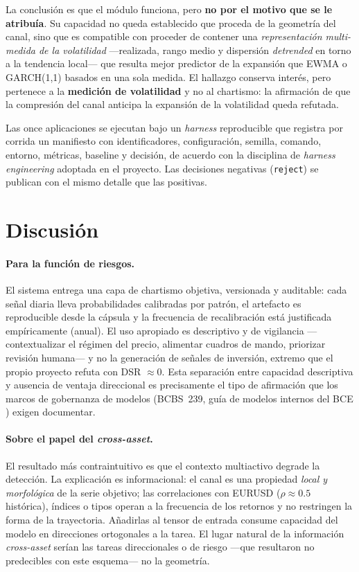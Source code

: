 \documentclass[11pt,a4paper]{article}
\begin{document}
La conclusión es que el módulo funciona, pero \textbf{no por el motivo que se le
atribuía}. Su capacidad no queda establecido que proceda de la geometría del canal, sino que es compatible con proceder de contener una
\emph{representación multi-medida de la volatilidad} —realizada, rango medio y
dispersión \emph{detrended} en torno a la tendencia local— que resulta mejor
predictor de la expansión que EWMA o GARCH(1,1) basados en una sola medida. El
hallazgo conserva interés, pero pertenece a la \textbf{medición de volatilidad} y
no al chartismo: la afirmación de que la compresión del canal anticipa la
expansión de la volatilidad queda refutada.

Las once aplicaciones se ejecutan bajo un \emph{harness} reproducible que registra
por corrida un manifiesto con identificadores, configuración, semilla, comando,
entorno, métricas, baseline y decisión, de acuerdo con la disciplina de
\emph{harness engineering} adoptada en el proyecto. Las decisiones negativas
(\texttt{reject}) se publican con el mismo detalle que las positivas.

\section{Discusión}
\paragraph{Para la función de riesgos.} El sistema entrega una capa de chartismo
objetiva, versionada y auditable: cada señal diaria lleva probabilidades
calibradas por patrón, el artefacto es reproducible desde la cápsula y la
frecuencia de recalibración está justificada empíricamente (anual). El uso
apropiado es descriptivo y de vigilancia —contextualizar el régimen del precio,
alimentar cuadros de mando, priorizar revisión humana— y no la generación de
señales de inversión, extremo que el propio proyecto refuta con DSR $\approx 0$.
Esta separación entre capacidad descriptiva y ausencia de ventaja direccional es
precisamente el tipo de afirmación que los marcos de gobernanza de modelos
(BCBS~239, guía de modelos internos del BCE \cite{bcbs239,ecb2025guide}) exigen
documentar.

\paragraph{Sobre el papel del \emph{cross-asset}.} El resultado más
contraintuitivo es que el contexto multiactivo degrade la detección. La
explicación es informacional: el canal es una propiedad \emph{local y
morfológica} de la serie objetivo; las correlaciones con EURUSD ($\rho \approx
0.5$ histórica), índices o tipos operan a la frecuencia de los retornos y no
restringen la forma de la trayectoria. Añadirlas al tensor de entrada consume
capacidad del modelo en direcciones ortogonales a la tarea. El lugar natural de
la información \emph{cross-asset} serían las tareas direccionales o de riesgo
—que resultaron no predecibles con este esquema— no la geometría.
\end{document}
